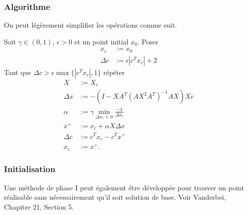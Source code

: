\documentclass[t,usepdftitle=false]{beamer}
\begin{document}
\begin{frame}
	\frametitle{Algorithme}
	
	On peut légèrement simplifier les opérations comme suit.
	
	Soit $\gamma \in (0,1)$, $\epsilon > 0$ et un point initial $x_0$.
	Poser
	\begin{align*}
		x_c &:= x_0 \\
		\Delta c &:= \epsilon|c^Tx_c|+2
	\end{align*}
	Tant que $\Delta c > \epsilon\max\{|c^Tx_c|,1\}$ répéter
	\begin{align*}
		X &:= X_c \\
		\Delta x &:= -(I - XA^T(AX^2A^T)^{-1}AX)Xc \\
		\alpha &:= \gamma \min_{\Delta x_i < 0} \frac{-1}{\Delta x_i} \\
		x^+ &:= x_c + \alpha X \Delta x \\
		\Delta c &:= c^Tx_c - c^Tx^+ \\
		x_c &:= x^+.
	\end{align*}
	
\end{frame}

\begin{frame}
\frametitle{Initialisation}

Une méthode de phase I peut également être développée pour trouver un point réalisable sans nécessairement qu'il soit solution de base. Voir Vanderbei, Chapitre 21, Section 5.
\end{frame}
\end{document}
